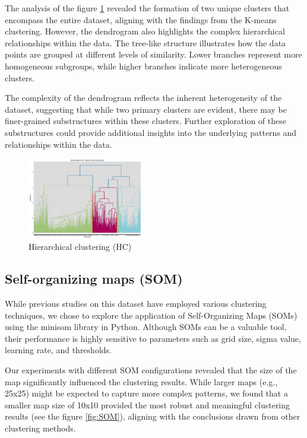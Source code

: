 \documentclass{llncs}
\begin{document}
The analysis of the figure \ref{fig:hyerarchical} revealed the formation of two unique clusters that encompass the entire dataset, aligning with the findings from the K-means clustering. However, the dendrogram also highlights the complex hierarchical relationships within the data. The tree-like structure illustrates how the data points are grouped at different levels of similarity. Lower branches represent more homogeneous subgroups, while higher branches indicate more heterogeneous clusters.

The complexity of the dendrogram reflects the inherent heterogeneity of the dataset, suggesting that while two primary clusters are evident, there may be finer-grained substructures within these clusters. Further exploration of these substructures could provide additional insights into the underlying patterns and relationships within the data.
 
 

  \begin{figure}[h!]
 	\begin{center}  %
 		\includegraphics[width=0.45\textwidth]{images/hierarchical_clustering.png}
 		\caption{Hierarchical clustering (HC)}
 		\label{fig:hyerarchical}
 	\end{center}
 \end{figure}
 
  \subsection{Self-organizing maps (SOM)}
  
  While previous studies on this dataset have employed various clustering techniques, we chose to explore the application of Self-Organizing Maps (SOMs) using the minisom library in Python. Although SOMs can be a valuable tool, their performance is highly sensitive to parameters such as grid size, sigma value, learning rate, and thresholds.
  
  Our experiments with different SOM configurations revealed that the size of the map significantly influenced the clustering results. While larger maps (e.g., 25x25) might be expected to capture more complex patterns, we found that a smaller map size of 10x10 provided the most robust and meaningful clustering results (see the figure \ref{fig:SOM}), aligning with the conclusions drawn from other clustering methods.
  
\end{document}
